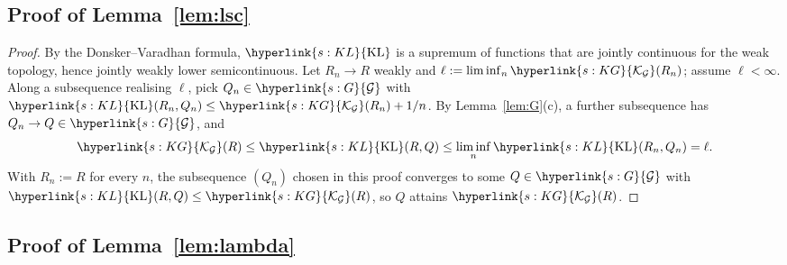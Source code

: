 \documentclass[11pt]{article}
\newcommand{\sy}[2]{{\hyperlink{#1}{#2}}}
\newcommand{\KL}{\sy{s:KL}{\mathrm{KL}}}
\newcommand{\Gk}{\sy{s:G}{\mathcal{G}}}
\newcommand{\KG}{\sy{s:KG}{\mathcal{K}_{\mathcal{G}}}}
\begin{document}
\subsection{Proof of Lemma~\ref{lem:lsc}}\label{sec:proof-lem-lsc}

\begin{proof}
By the Donsker--Varadhan formula, $\KL$ is a supremum of functions that are jointly continuous for the weak
topology, hence jointly weakly lower semicontinuous. Let $R_n\to R$ weakly and $\ell:=\liminf_n\KG(R_n)$; assume
$\ell<\infty$. Along a subsequence realising $\ell$, pick $Q_n\in\Gk$ with $\KL(R_n,Q_n)\le\KG(R_n)+1/n$. By
Lemma~\ref{lem:G}(c), a further subsequence has $Q_n\to Q\in\Gk$, and
\begin{equation*}
  \KG(R)\le\KL(R,Q)\le\liminf_n\KL(R_n,Q_n)=\ell .
\end{equation*}
With $R_n:=R$ for every $n$, the subsequence $(Q_n)$ chosen in this proof converges to some $Q\in\Gk$ with
$\KL(R,Q)\le\KG(R)$, so $Q$ attains $\KG(R)$.
\end{proof}

\subsection{Proof of Lemma~\ref{lem:lambda}}\label{sec:proof-lem-lambda}
\end{document}

